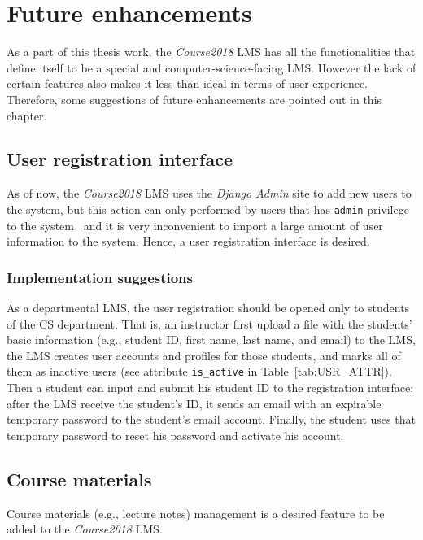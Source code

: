 

\chapter{Future enhancements}
\label{chap:FUTURE}

As a part of this thesis work, 
the \emph{Course2018} LMS has all the functionalities that define itself
to be a special and computer-science-facing LMS.
However the lack of certain features also makes it less than ideal in terms
of user experience.
Therefore, some suggestions of future enhancements are pointed out in this
chapter.

\section{User registration interface}
As of now, the \emph{Course2018} LMS uses the \emph{Django Admin} site to
add new users to the system, but this action can only performed by users that
has \texttt{admin} privilege to the system~\cite{djangoAdmin} and it is very
inconvenient to import a large amount of user information to the system.
Hence, a user registration interface is desired.

\subsection{Implementation suggestions}
As a departmental LMS, the user registration should be opened only to students
of the CS department.
That is, an instructor first upload a file with the students' basic information
(e.g., student ID, first name, last name, and email) to the LMS, the LMS
creates user accounts and profiles for those students, and marks all of them
as inactive users (see attribute \texttt{is\_active} in
Table~\ref{tab:USR_ATTR}).
Then a student can input and submit his student ID to the registration
interface; after the LMS receive the student's ID,
it sends an email with an expirable temporary password to the student's
email account.
Finally, the student uses that temporary password to reset his password and
activate his account.

\section{Course materials}
Course materials (e.g., lecture notes) management is a desired feature to be
added to the \emph{Course2018} LMS.


